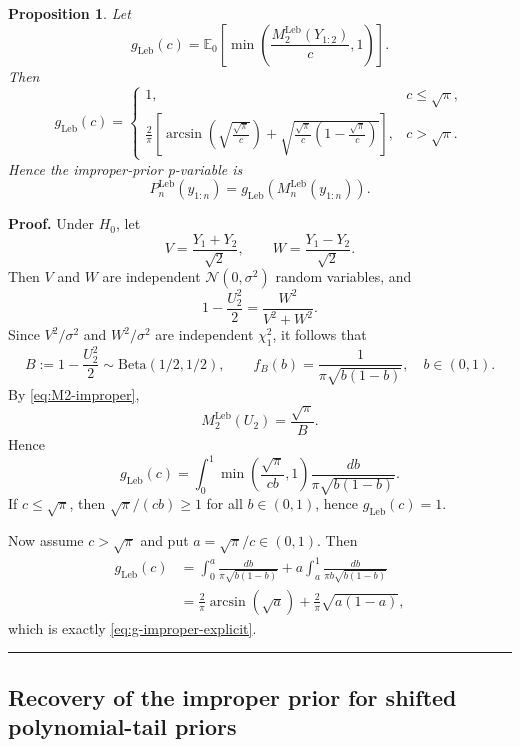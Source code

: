 \documentclass{article}%
\newtheorem{proposition}[theorem]{Proposition}
\newenvironment{proof}[1][Proof]{\noindent\textbf{#1.} }{\ \rule{0.5em}{0.5em}}
\newcommand{\E}{\mathbb{E}}
\begin{document}
\begin{proposition}\label{prop:g-improper}
Let
\[
g_{\mathrm{Leb}}(c)
=
\E_0\!\left[\min\!\left(\frac{M_2^{\mathrm{Leb}}(Y_{1:2})}{c},1\right)\right].
\]
Then
\begin{equation}\label{eq:g-improper-explicit}
g_{\mathrm{Leb}}(c)=
\begin{cases}
1, & c\le \sqrt{\pi},\\[0.8em]
\displaystyle
\frac{2}{\pi}
\left[
\arcsin\!\left(\sqrt{\frac{\sqrt\pi}{c}}\right)
+
\sqrt{\frac{\sqrt\pi}{c}\left(1-\frac{\sqrt\pi}{c}\right)}
\right],
& c>\sqrt{\pi}.
\end{cases}
\end{equation}
Hence the improper-prior p-variable is
\begin{equation}\label{eq:p-improper}
P_n^{\mathrm{Leb}}(y_{1:n})
=
g_{\mathrm{Leb}}\!\left(M_n^{\mathrm{Leb}}(y_{1:n})\right).
\end{equation}
\end{proposition}

\begin{proof}
Under $H_0$, let
\[
V=\frac{Y_1+Y_2}{\sqrt 2},
\qquad
W=\frac{Y_1-Y_2}{\sqrt 2}.
\]
Then $V$ and $W$ are independent $\mathcal N(0,\sigma^2)$ random variables, and
\[
1-\frac{U_2^2}{2}
=
\frac{W^2}{V^2+W^2}.
\]
Since $V^2/\sigma^2$ and $W^2/\sigma^2$ are independent $\chi_1^2$, it follows that
\[
B:=1-\frac{U_2^2}{2}\sim \mathrm{Beta}(1/2,1/2),
\qquad
f_B(b)=\frac{1}{\pi\sqrt{b(1-b)}},\quad b\in(0,1).
\]
By \eqref{eq:M2-improper},
\[
M_2^{\mathrm{Leb}}(U_2)=\frac{\sqrt{\pi}}{B}.
\]
Hence
\[
g_{\mathrm{Leb}}(c)
=
\int_0^1 \min\!\left(\frac{\sqrt{\pi}}{cb},1\right)\frac{db}{\pi\sqrt{b(1-b)}}.
\]
If $c\le \sqrt{\pi}$, then $\sqrt{\pi}/(cb)\ge 1$ for all $b\in(0,1)$, hence $g_{\mathrm{Leb}}(c)=1$.

Now assume $c>\sqrt{\pi}$ and put $a=\sqrt{\pi}/c\in(0,1)$. Then
\begin{align*}
g_{\mathrm{Leb}}(c)
&=
\int_0^a \frac{db}{\pi\sqrt{b(1-b)}}
+
a\int_a^1 \frac{db}{\pi b\sqrt{b(1-b)}}\\
&=
\frac{2}{\pi}\arcsin(\sqrt a)
+
\frac{2}{\pi}\sqrt{a(1-a)},
\end{align*}
which is exactly \eqref{eq:g-improper-explicit}.
\end{proof}

\subsection{Recovery of the improper prior for shifted polynomial-tail priors}
\end{document}
